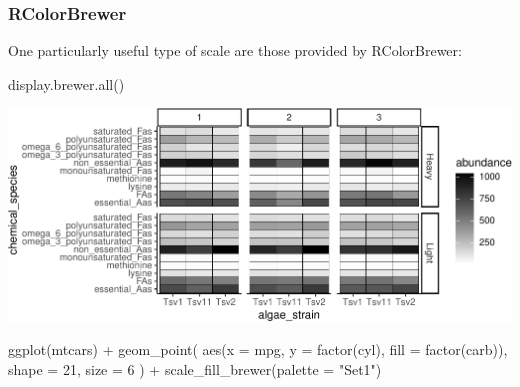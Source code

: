 \documentclass[
]{krantz}
\newenvironment{Shaded}{\begin{snugshade}}{\end{snugshade}}
\newcommand{\AttributeTok}[1]{\textcolor[rgb]{0.77,0.63,0.00}{#1}}
\newcommand{\DecValTok}[1]{\textcolor[rgb]{0.00,0.00,0.81}{#1}}
\newcommand{\FunctionTok}[1]{\textcolor[rgb]{0.00,0.00,0.00}{#1}}
\newcommand{\NormalTok}[1]{#1}
\newcommand{\SpecialCharTok}[1]{\textcolor[rgb]{0.00,0.00,0.00}{#1}}
\newcommand{\StringTok}[1]{\textcolor[rgb]{0.31,0.60,0.02}{#1}}
\begin{document}
\hypertarget{rcolorbrewer}{%
\subsubsection{RColorBrewer}\label{rcolorbrewer}}

One particularly useful type of scale are those provided by RColorBrewer:

\begin{Shaded}
\begin{Highlighting}[]
\FunctionTok{display.brewer.all}\NormalTok{()}
\end{Highlighting}
\end{Shaded}

\begin{center}\includegraphics{index_files/figure-latex/unnamed-chunk-60-1} \end{center}

\begin{Shaded}
\begin{Highlighting}[]
\FunctionTok{ggplot}\NormalTok{(mtcars) }\SpecialCharTok{+}
  \FunctionTok{geom\_point}\NormalTok{(}
    \FunctionTok{aes}\NormalTok{(}\AttributeTok{x =}\NormalTok{ mpg, }\AttributeTok{y =} \FunctionTok{factor}\NormalTok{(cyl), }\AttributeTok{fill =} \FunctionTok{factor}\NormalTok{(carb)), }
    \AttributeTok{shape =} \DecValTok{21}\NormalTok{, }\AttributeTok{size =} \DecValTok{6}
\NormalTok{  ) }\SpecialCharTok{+}
  \FunctionTok{scale\_fill\_brewer}\NormalTok{(}\AttributeTok{palette =} \StringTok{"Set1"}\NormalTok{)}
\end{Highlighting}
\end{Shaded}
\end{document}

